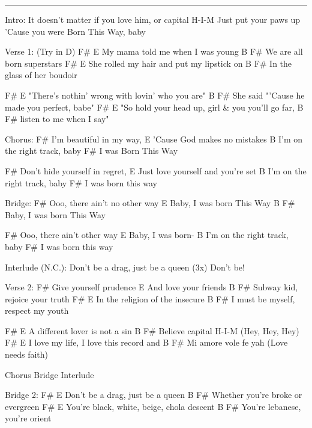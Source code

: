 \noindent\rule{\columnwidth}{1pt}

\begin{multicols}{2}
\begin{lstsong}
Intro:
It doesn't matter if you love him,
or capital H-I-M
Just put your paws up
'Cause you were Born This Way, baby

Verse 1: (Try in D)
F#                   E
My mama told me when I was young
B                    F#
We are all born superstars
F#                     E
She rolled my hair and put my lipstick on
B                      F#
In the glass of her boudoir

F#                           E
"There's nothin' wrong with lovin' who you are"
B           F#
She said "'Cause he made you perfect, babe"
F#                     E
"So hold your head up, girl \& you you'll go far,
B                    F#
listen to me when I say"

Chorus:
    F#
I'm beautiful in my way,
       E
'Cause God makes no mistakes
           B
I'm on the right track, baby
      F#
I was Born This Way

           F#
Don't hide yourself in regret,
          E
Just love yourself and you're set
           B
I'm on the right track, baby
      F#
I was born this way
\end{lstsong}\vfill\columnbreak\begin{lstsong}
Bridge:
F#
Ooo, there ain't no other way
E
Baby, I was born This Way
B          F#
Baby, I was born This Way

F#
Ooo, there ain't other way
E
Baby, I was born-
           B
I'm on the right track, baby
      F#
I was born this way

Interlude (N.C.):
Don't be a drag, just be a queen (3x)
Don't be!

Verse 2:
F#
Give yourself prudence
E
And love your friends
B                        F#
Subway kid, rejoice your truth
F#                     E
In the religion of the insecure
          B                  F#
I must be myself, respect my youth

F#                   E
A different lover is not a sin
B                  F#
Believe capital H-I-M (Hey, Hey, Hey)
F#                 E
I love my life, I love this record and
B                F#
Mi amore vole fe yah (Love needs faith)

Chorus
Bridge
Interlude
\end{lstsong}\vfill\columnbreak\begin{lstsong}
Bridge 2:
      F#              E
Don't be a drag, just be a queen
   B                    F#
Whether you're broke or evergreen
       F#                   E
You're black, white, beige, chola descent
       B                  F#
You're lebanese, you're orient


\end{lstsong}
\end{multicols}

